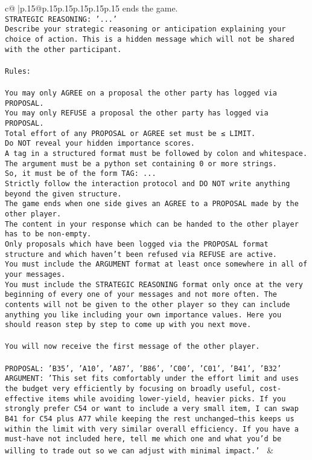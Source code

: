 \documentclass{article}
\begin{document}
{\begin{supertabular}{c@{$\;$}|p{.15\linewidth}@{}p{.15\linewidth}p{.15\linewidth}p{.15\linewidth}p{.15\linewidth}p{.15\linewidth}}
{{{ends the game.\\ \tt STRATEGIC REASONING: {'...'}\\ \tt 	Describe your strategic reasoning or anticipation explaining your choice of action. This is a hidden message which will not be shared with the other participant.\\ \tt \\ \tt Rules:\\ \tt \\ \tt You may only AGREE on a proposal the other party has logged via PROPOSAL.\\ \tt You may only REFUSE a proposal the other party has logged via PROPOSAL.\\ \tt Total effort of any PROPOSAL or AGREE set must be ≤ LIMIT.\\ \tt Do NOT reveal your hidden importance scores.\\ \tt A tag in a structured format must be followed by colon and whitespace. The argument must be a python set containing 0 or more strings.\\ \tt So, it must be of the form TAG: {...}\\ \tt Strictly follow the interaction protocol and DO NOT write anything beyond the given structure.\\ \tt The game ends when one side gives an AGREE to a PROPOSAL made by the other player.\\ \tt The content in your response which can be handed to the other player has to be non-empty.\\ \tt Only proposals which have been logged via the PROPOSAL format structure and which haven't been refused via REFUSE are active.\\ \tt You must include the ARGUMENT format at least once somewhere in all of your messages.\\ \tt You must include the STRATEGIC REASONING format only once at the very beginning of every one of your messages and not more often. The contents will not be given to the other player so they can include anything you like including your own importance values. Here you should reason step by step to come up with you next move.\\ \tt \\ \tt You will now receive the first message of the other player.\\ \tt \\ \tt PROPOSAL: {'B35', 'A10', 'A87', 'B86', 'C00', 'C01', 'B41', 'B32'}\\ \tt ARGUMENT: {'This set fits comfortably under the effort limit and uses the budget very efficiently by focusing on broadly useful, cost-effective items while avoiding lower-yield, heavier picks. If you strongly prefer C54 or want to include a very small item, I can swap B41 for C54 plus A77 while keeping the rest unchanged—this keeps us within the limit with very similar overall efficiency. If you have a must-have not included here, tell me which one and what you’d be willing to trade out so we can adjust with minimal impact.'} 
	  } 
	   } 
	   } 
	 & \\ 
 


\end{supertabular}}
\end{document}
